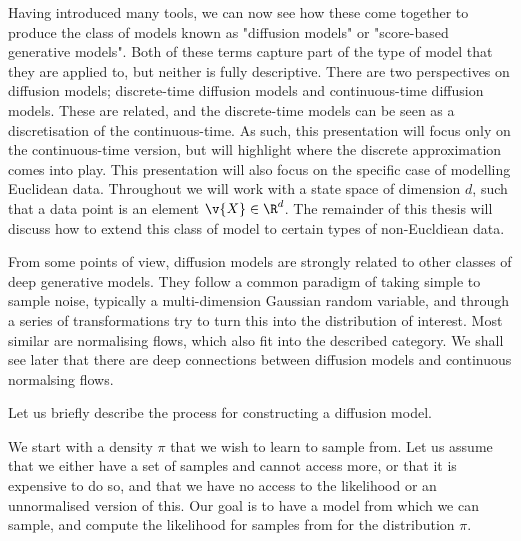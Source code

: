Having introduced many tools, we can now see how these come together to produce the class of models known as "diffusion models" or "score-based generative models".
Both of these terms capture part of the type of model that they are applied to, but neither is fully descriptive.
There are two perspectives on diffusion models; discrete-time diffusion models and continuous-time diffusion models.
These are related, and the discrete-time models can be seen as a discretisation of the continuous-time.
As such, this presentation will focus only on the continuous-time version, but will highlight where the discrete approximation comes into play.
This presentation will also focus on the specific case of modelling Euclidean data.
Throughout we will work with a state space of dimension \(d\), such that a data point is an element \(\v{X}\in \R^d\).
The remainder of this thesis will discuss how to extend this class of model to certain types of non-Eucldiean data.

From some points of view, diffusion models are strongly related to other classes of deep generative models.
They follow a common paradigm of taking simple to sample noise, typically a multi-dimension Gaussian random variable, and through a series of transformations try to turn this into the distribution of interest.
Most similar are normalising flows, which also fit into the described category.
We shall see later that there are deep connections between diffusion models and continuous normalsing flows.


Let us briefly describe the process for constructing a diffusion model.

We start with a density \(\pi\) that we wish to learn to sample from.
Let us assume that we either have a set of samples and cannot access more, or that it is expensive to do so, and that we have no access to the likelihood or an unnormalised version of this.
Our goal is to have a model from which we can sample, and compute the likelihood for samples from for the distribution \(\pi\).

